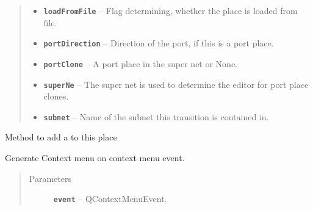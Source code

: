 \documentclass[a4paper,10pt,english]{sphinxmanual}
\begin{document}
\begin{fulllineitems}
\begin{fulllineitems}
\begin{quote}
\begin{description}
\begin{itemize}
\item {} 
\textbf{\texttt{loadFromFile}} -- Flag determining, whether the place is loaded from file.

\item {} 
\textbf{\texttt{portDirection}} -- Direction of the port, if this is a port place.

\item {} 
\textbf{\texttt{portClone}} -- A port place in the super net or None.

\item {} 
\textbf{\texttt{superNe}} -- The super net is used to determine the editor for port place clones.

\item {} 
\textbf{\texttt{subnet}} -- Name of the subnet this transition is contained in.

\end{itemize}

\end{description}\end{quote}

\end{fulllineitems}


\begin{fulllineitems}
\label{model_link:model.PlaceItem.PlaceItem.addToken}
Method to add a  to this place

\end{fulllineitems}


\begin{fulllineitems}
\label{model_link:model.PlaceItem.PlaceItem.contextMenuEvent}
Generate Context menu on context menu event.
\begin{quote}\begin{description}
\item[{Parameters}] \leavevmode
\textbf{\texttt{event}} -- QContextMenuEvent.

\end{description}\end{quote}

\end{fulllineitems}



\end{fulllineitems}
\end{document}
